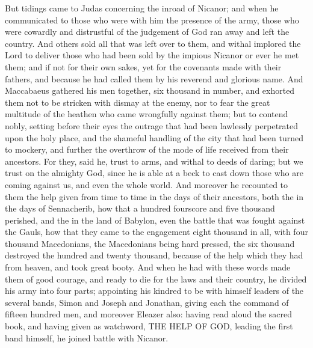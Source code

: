 {\par }{\PP {}But tidings came to Judas concerning the inroad of Nicanor; and when he communicated to those who were with him the presence of the army,
those who were cowardly and distrustful of the judgement of God
 ran away and left the country.
And others sold all that was left over to them, and withal implored the Lord to deliver those who had been sold
{} by the impious Nicanor or ever he met them;
and
{} if not for their own sakes, yet for the covenants made with their fathers, and because he had called them by his reverend and glorious name.
And Maccabaeus gathered his men together, six thousand in number, and exhorted them not to be stricken with dismay at the enemy, nor to fear the great multitude of the heathen who came wrongfully against them; but to contend nobly,
setting before their eyes the outrage that had been lawlessly perpetrated upon the holy place, and the shameful handling of the city that had been turned to mockery, and further the overthrow of the mode of life received from their ancestors.
For they, said he, trust to arms, and withal to deeds of daring; but we trust on the almighty God, since he is able at a beck to cast down those who are coming against us, and even the whole world.
And moreover he recounted to them the help given from time to time in the days of their ancestors, both the
{} in the days of Sennacherib, how that a hundred fourscore and five thousand perished,
and the
{} in the land of Babylon, even the battle that was fought against the
 Gauls, how that they came to the engagement eight thousand in all, with four thousand Macedonians,
{} the Macedonians being hard pressed, the
 six thousand destroyed the hundred and twenty thousand, because of the help which they had from heaven, and took great booty.
And when he had with these words made them of good courage, and ready to die for the laws and their country, he divided his army into four parts;
 appointing his kindred to be with himself leaders of the several bands,
{} Simon and Joseph and Jonathan, giving each the command of fifteen hundred men,
and moreover Eleazer also:
{} having read aloud the sacred book, and having given as watchword, THE HELP OF GOD, leading the first band himself, he joined battle with Nicanor.
}
